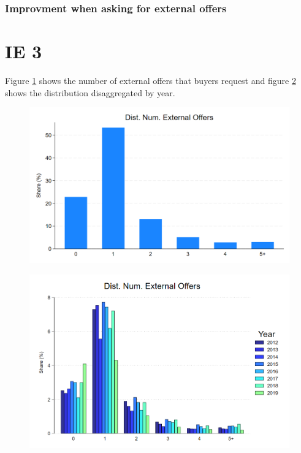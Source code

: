 \documentclass[12pt]{article}
\begin{document}



\subsubsection{Improvment when asking for external offers}







\section{IE 3}

Figure \ref{fig:ie3_0} shows the number of external offers that buyers request and figure \ref{fig:ie3_1} shows the distribution disaggregated by year. 

\begin{figure}[H]
\caption{}
\label{fig:ie3_0}
\centering{}%
\includegraphics[scale=0.27]{figures/IE3_dist_external_offers.png}
\end{figure}


\begin{figure}[H]
\caption{}
\label{fig:ie3_1}
\centering{}%
\includegraphics[scale=0.27]{figures/IE3_dist_external_offers_byyear.png}
\end{figure}
\end{document}
